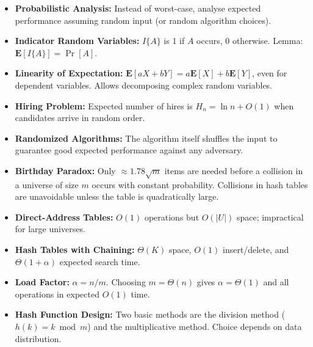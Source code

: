 \begin{tcolorbox}[colback=lightblue, colframe=keyblue, fonttitle=\bfseries,
                  title={Key Points}]
\begin{itemize}[noitemsep]
  \item \textbf{Probabilistic Analysis:} Instead of worst-case, analyse expected performance
        assuming random input (or random algorithm choices).
  \item \textbf{Indicator Random Variables:} $I\{A\}$ is 1 if $A$ occurs, 0 otherwise.
        Lemma: $\mathbf{E}[I\{A\}] = \Pr[A]$.
  \item \textbf{Linearity of Expectation:} $\mathbf{E}[aX + bY] = a\mathbf{E}[X] + b\mathbf{E}[Y]$,
        even for dependent variables. Allows decomposing complex random variables.
  \item \textbf{Hiring Problem:} Expected number of hires is $H_n = \ln n + O(1)$ when
        candidates arrive in random order.
  \item \textbf{Randomized Algorithms:} The algorithm itself shuffles the input to guarantee
        good expected performance against any adversary.
  \item \textbf{Birthday Paradox:} Only $\approx 1.78\sqrt{m}$ items are needed before a
        collision in a universe of size $m$ occurs with constant probability. Collisions in
        hash tables are unavoidable unless the table is quadratically large.
  \item \textbf{Direct-Address Tables:} $O(1)$ operations but $O(|U|)$ space; impractical
        for large universes.
  \item \textbf{Hash Tables with Chaining:} $\Theta(K)$ space, $O(1)$ insert/delete, and
        $\Theta(1 + \alpha)$ expected search time.
  \item \textbf{Load Factor:} $\alpha = n/m$. Choosing $m = \Theta(n)$ gives $\alpha = \Theta(1)$
        and all operations in expected $O(1)$ time.
  \item \textbf{Hash Function Design:} Two basic methods are the division method
        ($h(k) = k \bmod m$) and the multiplicative method. Choice depends on data distribution.
\end{itemize}
\end{tcolorbox}